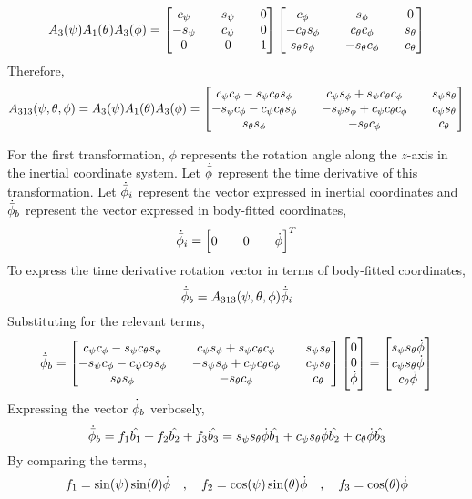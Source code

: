 \documentclass[class=report, 12pt, crop=false]{standalone}
\begin{document}
\begin{center}
$$A_{3}(\psi)A_{1}(\theta)A_{3}(\phi)= \begin{bmatrix}
c_\psi && s_\psi && 0 \\
-s_\psi && c_\psi && 0 \\
0 && 0 && 1 
\end{bmatrix}\begin{bmatrix}
c_\phi && s_\phi && 0 \\
-c_\theta s_\phi && c_\theta c_\phi && s_\theta \\
s_\theta s_\phi && -s_\theta c_\phi && c_\theta 
\end{bmatrix}$$
Therefore,
$$A_{313}(\psi,\theta,\phi) = A_{3}(\psi)A_{1}(\theta)A_{3}(\phi) = \begin{bmatrix}
c_\psi c_\phi - s_\psi c_\theta s_\phi && c_\psi s_\phi + s_\psi c_\theta c_\phi&& s_\psi s_\theta\\
-s_\psi c_\phi - c_\psi c_\theta s_\phi && -s_\psi s_\phi + c_\psi c_\theta c_\phi && c_\psi s_\theta\\
s_\theta s_\phi && -s_\theta c_\phi && c_\theta 
\end{bmatrix}$$

For the first transformation, $\phi$ represents the rotation angle along the $z$-axis in the inertial coordinate system. Let $\dot{\bar{\phi}}$ represent the time derivative of this transformation. Let $\dot{\bar{\phi}}_i$ represent the vector expressed in inertial coordinates and $\dot{\bar{\phi}}_b$ represent the vector expressed in body-fitted coordinates,
$$\dot{\bar{\phi}}_i = \begin{bmatrix}0 && 0 && \dot{\phi}\end{bmatrix}^T$$
To express the time derivative rotation vector in terms of body-fitted coordinates,
$$\dot{\bar{\phi}}_b = A_{313}(\psi,\theta,\phi)\dot{\bar{\phi}}_i$$
Substituting for the relevant terms,
$$\dot{\bar{\phi}}_b = \begin{bmatrix}
c_\psi c_\phi - s_\psi c_\theta s_\phi && c_\psi s_\phi + s_\psi c_\theta c_\phi&& s_\psi s_\theta\\
-s_\psi c_\phi - c_\psi c_\theta s_\phi && -s_\psi s_\phi + c_\psi c_\theta c_\phi && c_\psi s_\theta\\
s_\theta s_\phi && -s_\theta c_\phi && c_\theta 
\end{bmatrix}\begin{bmatrix}
0 \\ 0 \\ \dot{\phi}\end
{bmatrix} = \begin{bmatrix}
s_\psi s_\theta \dot{\phi}\\
c_\psi s_\theta \dot{\phi}\\
c_\theta\dot{\phi}
\end{bmatrix}$$
Expressing the vector $\dot{\bar{\phi}}_b$ verbosely,
$$\dot{\bar{\phi}}_b = f_1\hat{b_1} + f_2\hat{b_2} + f_3\hat{b_3} = s_\psi s_\theta \dot{\phi}\hat{b_1} + c_\psi s_\theta \dot{\phi}\hat{b_2} + c_\theta\dot{\phi}\hat{b_3}$$
By comparing the terms,
$$\displaystyle{f_1 = \sin(\psi)\sin(\theta)\dot{\phi} \quad,\quad f_2 = \cos(\psi)\sin(\theta)\dot{\phi} \quad,\quad f_3 = \cos(\theta)\dot{\phi}}$$




\end{center}
\end{document}
